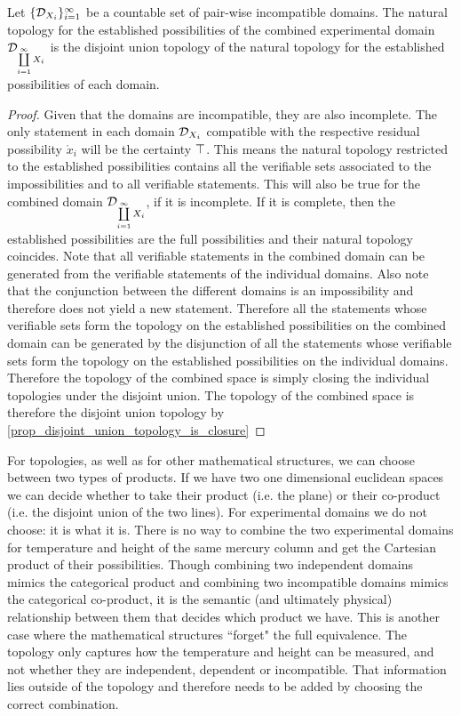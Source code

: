 \documentclass[11pt,letterpaper,fleqn]{memoir} %
\begin{document}
\begin{mathSection}
	\begin{prop}
		Let $\{\mathcal{D}_{X_i}\}_{i=1}^{\infty}$ be a countable set of pair-wise incompatible domains. The natural topology for the established possibilities of the combined experimental domain $\mathcal{D}_{\coprod\limits_{i=1}^{\infty} X_i}$ is the disjoint union topology of the natural topology for the established possibilities of each domain.
	\end{prop}
	\begin{proof}
		Given that the domains are incompatible, they are also incomplete. The only statement in each domain $\mathcal{D}_{X_i}$ compatible with the respective residual possibility $\mathring{x}_i$ will be the certainty $\top$. This means the natural topology restricted to the established possibilities contains all the verifiable sets associated to the impossibilities and to all verifiable statements. This will also be true for the combined domain $\mathcal{D}_{\coprod\limits_{i=1}^{\infty} X_i}$, if it is incomplete. If it is complete, then the established possibilities are the full possibilities and their natural topology coincides. Note that all verifiable statements in the combined domain can be generated from the verifiable statements of the individual domains. Also note that the conjunction between the different domains is an impossibility and therefore does not yield a new statement. Therefore all the statements whose verifiable sets form the topology on the established possibilities on the combined domain can be generated by the disjunction of all the statements whose verifiable sets form  the topology on the established possibilities on the individual domains. Therefore the topology of the combined space is simply closing the individual topologies under the disjoint union. The topology of the combined space is therefore the disjoint union topology by \ref{prop_disjoint_union_topology_is_closure}
	\end{proof}
\end{mathSection}

For topologies, as well as for other mathematical structures, we can choose between two types of products. If we have two one dimensional euclidean spaces we can decide whether to take their product (i.e. the plane) or their co-product (i.e. the disjoint union of the two lines). For experimental domains we do not choose: it is what it is. There is no way to combine the two experimental domains for temperature and height of the same mercury column and get the Cartesian product of their possibilities. Though combining two independent domains mimics the categorical product and combining two incompatible domains mimics the categorical co-product, it is the semantic (and ultimately physical) relationship between them that decides which product we have. This is another case where the mathematical structures ``forget" the full equivalence. The topology only captures how the temperature and height can be measured, and not whether they are independent, dependent or incompatible. That information lies outside of the topology and therefore needs to be added by choosing the correct combination.
\end{document}
